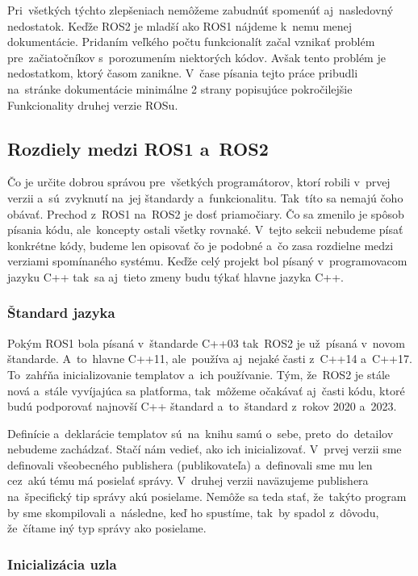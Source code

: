 Pri~všetkých týchto zlepšeniach nemôžeme zabudnúť spomenúť aj~nasledovný nedostatok. Keďže ROS2 je mladší ako ROS1 nájdeme k~nemu menej dokumentácie.
Pridaním veľkého počtu funkcionalít začal vznikať problém pre~začiatočníkov s~porozumením niektorých kódov. Avšak tento problém je nedostatkom,
ktorý časom zanikne. V~čase písania tejto práce pribudli na~stránke dokumentácie minimálne 2 strany popisujúce pokročilejšie Funkcionality druhej
verzie ROSu.

\subsection{Rozdiely medzi ROS1 a~ROS2}

Čo je určite dobrou správou pre~všetkých programátorov, ktorí robili v~prvej verzii a~sú~zvyknutí na~jej štandardy a~funkcionalitu. Tak~títo
sa nemajú čoho obávať. Prechod z~ROS1 na~ROS2 je dosť priamočiary. Čo sa zmenilo je spôsob písania kódu, ale~koncepty ostali všetky rovnaké.
V~tejto sekcii nebudeme písať konkrétne kódy, budeme len opisovať čo je podobné a~čo zasa rozdielne medzi verziami spomínaného systému. Keďže
celý projekt bol písaný v~programovacom jazyku C++ tak~sa aj~tieto zmeny budu týkať hlavne jazyka C++.

\subsubsection{Štandard jazyka}

	Pokým ROS1 bola písaná v~štandarde C++03 tak~ROS2 je už~písaná v~novom štandarde. A~to~hlavne C++11, ale~používa aj~nejaké časti z~C++14
	a~C++17. To~zahŕňa inicializovanie templatov a~ich používanie. Tým, že~ROS2 je stále nová a~stále vyvíjajúca sa platforma, tak~môžeme očakávať aj~časti
	kódu, ktoré budú podporovať najnovší C++ štandard a~to~štandard z~rokov 2020 a~2023.

	Definície a~deklarácie templatov sú~na~knihu samú o~sebe, preto~do~detailov nebudeme zachádzať. Stačí nám vedieť, ako ich inicializovať.
	V~prvej verzii sme definovali všeobecného publishera (publikovateľa) a~definovali sme mu len cez~akú tému má posielať správy. V~druhej verzii
	naväzujeme publishera na~špecifický tip správy akú posielame. Nemôže sa teda stať, že~takýto program by sme skompilovali a~následne, keď
	ho spustíme, tak~by spadol z~dôvodu, že~čítame iný typ správy ako posielame.

\subsubsection{Inicializácia uzla}

